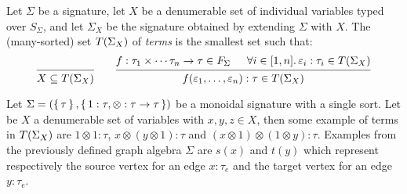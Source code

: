 \begin{definition}[Term]
  Let $\Sigma$ be a signature, let $X$ be a denumerable set of individual variables typed over $S_\Sigma$, and let
  $\Sigma_X$ be the signature obtained by extending $\Sigma$ with $X$. The (many-sorted) set $T({\Sigma}_{X})$ of
  \emph{terms} is the smallest set such that:
  \[
    \begin{prooftree}
      \hypo{\phantom{[1,n]}} %
      \infer1{X \subseteq \terms{\Sigma}{X}}
    \end{prooftree}
    \qquad
    \begin{prooftree}
      \hypo{f : \tau_1 \times \cdots \tau_n \to \tau \in F_\Sigma}
      \hypo{\forall i \in [1,n] \ldotp \epsilon_i : \tau_i \in \terms{\Sigma}{X}}
      \infer2{f(\epsilon_1, \ldots, \epsilon_n) : \tau \in \terms{\Sigma}{X}}
    \end{prooftree}
  \]
\end{definition}

\begin{example}[Terms]
  Let $\Sigma = (\set{\tau}, \set{1 : \tau, \otimes : \tau \to \tau})$ be a monoidal signature with a single sort. Let
  be $X$ a denumerable set of variables with $x, y, z \in X$, then some example of terms in $T({\Sigma}_{X})$ are $1
  \otimes 1 : \tau$, $x \otimes (y \otimes 1) : \tau$ and $(x \otimes 1) \otimes (1 \otimes y) : \tau$. Examples from
  the previously defined graph algebra $\Sigma$ are $s(x)$ and $t(y)$ which represent respectively the source vertex for
  an edge $x : \tau_e$ and the target vertex for an edge $y : \tau_e$.
\end{example}
